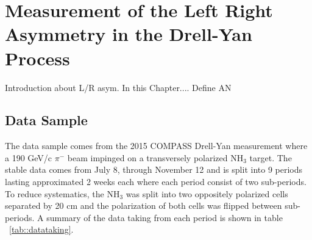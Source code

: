 \chapter{Measurement of the Left Right Asymmetry in the Drell-Yan Process} 
\label{Chap::setup}
\ifpdf
\graphicspath{{Chapters/OneCh/Figs/Raster/}{Chapters/OneCh/Figs/PDF/}{Chapters/OneCh/Figs/}}
\else \graphicspath{{Chapters/OneCh/Figs/Vector/}{Chapters/OneCh/Figs/}} \fi

Introduction about L/R asym.  In this Chapter....  Define AN

\section{Data Sample}
The data sample comes from the 2015 COMPASS Drell-Yan measurement where a 190
GeV/c $\pi^-$ beam impinged on a transversely polarized NH$_3$ target.  The
stable data comes from July 8, through November 12 and is split into 9 periods
lasting approximated 2 weeks each where each period consist of two sub-periods.
To reduce systematics, the NH$_3$ was split into two oppositely polarized cells
separated by 20 cm and the polarization of both cells was flipped between
sub-periods.  A summary of the data taking from each period is shown in table
~\ref{tab::datataking}.

